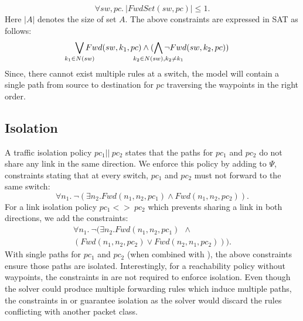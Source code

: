 \begin{equation}
		\forall sw,pc .\ |FwdSet(sw,pc)| \leq 1 \label{eq:fwdset}.
\end{equation}
Here $|A|$ denotes the size of set $A$. The above constraints are expressed in SAT 
as follows: 
\begin{equation}
\bigvee_{\mathclap{k_1 \in N(sw)}} Fwd(sw, k_1, pc) \wedge (\bigwedge_{\mathclap{k_2 \in N(sw), k_2 \not= k_1}} \neg Fwd(sw, k_2, pc))
\end{equation}
Since, there cannot exist multiple rules at a switch, the model will contain a 
single path from source to destination for $pc$ traversing the
waypoints in the right order.

\subsection{Isolation}
A traffic isolation policy $pc_1 || \ pc_2$ states that the paths for
$pc_1$ and $pc_2$ do not share any link in the same direction.  We
enforce this policy by adding to $\Psi$, constraints stating that at every
switch, $pc_1$ and $pc_2$ must not forward to the same switch:
\begin{equation}
	\forall n_1.~\neg ( \exists n_2. Fwd(n_1,n_2,pc_1) \wedge Fwd(n_1,n_2,pc_2)). \label{eq:isolation}
\end{equation}
For a link isolation policy $pc_1 <> \ pc_2$ which prevents sharing a link
in both directions, we add the constraints:
\begin{multline}
\forall n_1.~\neg ( \exists n_2. Fwd(n_1,n_2,pc_1) ~~\wedge \\ (Fwd(n_1,n_2,pc_2) \vee Fwd(n_2,n_1,pc_2))). \label{eq:linkisolation}
\end{multline}
With single paths for $pc_1$ and $pc_2$ (when combined 
with ), the above constraints ensure those
paths are isolated. 
Interestingly, for a reachability policy without waypoints,  
the constraints in  are not required to enforce isolation. 
Even though the solver could produce multiple forwarding rules which induce multiple paths, 
the constraints in  or  guarantee 
isolation as the solver would discard
the rules conflicting with another packet class.

